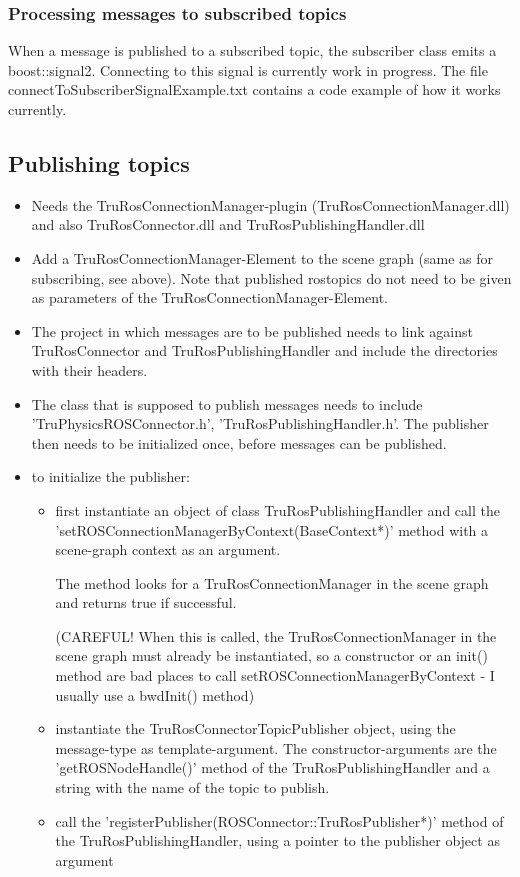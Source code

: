 \documentclass[a4paper, 10pt]{article}
\begin{document}
\subsubsection*{Processing messages to subscribed topics}
When a message is published to a subscribed topic, the subscriber class emits a boost::signal2. Connecting to this signal is currently work in progress. The file connectToSubscriberSignalExample.txt contains a code example of how it works currently.

\clearpage
\subsection*{Publishing topics}
\begin{itemize}
    \item Needs the TruRosConnectionManager-plugin (TruRosConnectionManager.dll) and also TruRosConnector.dll and TruRosPublishingHandler.dll
    
    \item Add a TruRosConnectionManager-Element to the scene graph (same as for subscribing, see above). Note that published rostopics do not need to be given as parameters of the TruRosConnectionManager-Element.

    \item The project in which messages are to be published needs to link against TruRosConnector and TruRosPublishingHandler and include the directories with their headers.
    
    \item The class that is supposed to publish messages needs to include 'TruPhysicsROSConnector.h', 'TruRosPublishingHandler.h'. The publisher then needs to be initialized once, before messages can be published.
    
    \item to initialize the publisher:
    \begin{itemize}
        \item first instantiate an object of class TruRosPublishingHandler and call the 'setROSConnectionManagerByContext(BaseContext*)' method with a scene-graph context as an argument.
        
        The method looks for a TruRosConnectionManager in the scene graph and returns true if successful.
        
        (CAREFUL! When this is called, the TruRosConnectionManager in the scene graph must already be instantiated, so a constructor or an init() method are bad places to call setROSConnectionManagerByContext - I usually use a bwdInit() method)
        \item instantiate the TruRosConnectorTopicPublisher object, using the message-type as template-argument. The constructor-arguments are the 'getROSNodeHandle()' method of the TruRosPublishingHandler and a string with the name of the topic to publish.
        \item call the 'registerPublisher(ROSConnector::TruRosPublisher*)' method of the TruRosPublishingHandler, using a pointer to the publisher object as argument
    \end{itemize}
        

\end{itemize}
\end{document}
